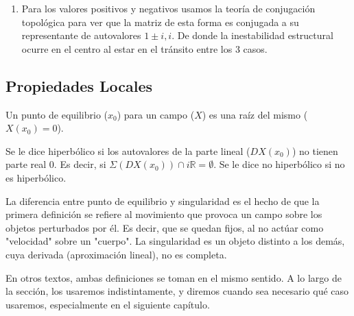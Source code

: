 \begin{exmp}
\begin{enumerate}
		Tomando $\mu <0$:
		
		\begin{equation*}
			\forall (x,y) \in K, \lim_{t\to \infty }\varphi_{Y_\mu}^t(x,y) = \lim_{t\to \infty }e^{t\mu}\varphi_X^t (x,y) = 0
		\end{equation*}
		
		Mientras que $\forall a \in \mathbb{R}, \nexists\lim_{t\to \infty }\varphi_X^t (a,0)$. 
		
		Luego, para $a$ lo suficientemente pequeño como para que $(a,0), h(a,0) \in K$: 
		
		\begin{align*}
			h^{-1}(0) &= h^{-1}(\lim_{t \to \infty} \varphi_{Y_\mu}^t (h(a,0)) ) \\
			&= h^{-1}(\lim_{t \to \infty} \varphi_{Y_\mu}^{\tau((a,0),t)} (h(a,0)) ) \\
			&= \lim_{t \to \infty} h^{-1}\circ\varphi_{Y_\mu}^{\tau((a,0),t)}\circ h(a,0)\\
			&= \lim_{t \to \infty}\varphi_X^{t}(a,0) 
		\end{align*}
		
		Lo cual contradice la inexistencia del límite. Por tanto, no son equivalentes.
		
		\item   Para los valores positivos y negativos usamos la teoría de conjugación topológica para ver que la matriz de esta forma es conjugada a su representante de autovalores $1\pm i, i$. De donde la inestabilidad estructural ocurre en el centro al estar en el tránsito entre los 3 casos. 
	\end{enumerate}
\end{exmp}



\subsection{Propiedades Locales}


\begin{defn}
	Un punto de equilibrio ($x_0$) para un campo ($X$) es una raíz del mismo ($X(x_0)=0$).
	
	Se le dice hiperbólico si los autovalores de la parte lineal ($DX(x_0)$) no tienen parte real $0$. Es decir, si $\Sigma(DX(x_0))\cap i\mathbb{R} = \emptyset$. Se le dice no hiperbólico si no es hiperbólico.
\end{defn}

\begin{rmrk}
	La diferencia entre punto de equilibrio y singularidad es el hecho de que la primera definición se refiere al movimiento que provoca un campo sobre los objetos perturbados por él. Es decir, que se quedan fijos, al no actúar como "velocidad" sobre un "cuerpo". La singularidad es un objeto distinto a los demás, cuya derivada (aproximación lineal), no es completa.
	
	En otros textos, ambas definiciones se toman en el mismo sentido. A lo largo de la sección, los usaremos indistintamente, y diremos cuando sea necesario qué caso usaremos, especialmente en el siguiente capítulo.
\end{rmrk}



